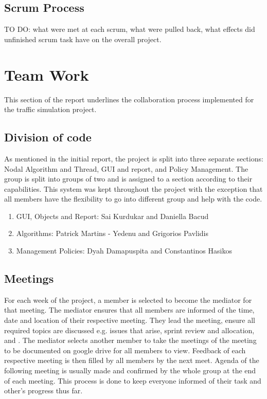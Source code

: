 \documentclass{article}
\begin{document}
		\subsection{Scrum Process}
			TO DO: what were met at each scrum, what were pulled back, what effects did unfinished scrum task have on the overall project.
	\section{Team Work}
		This section of the report underlines the collaboration process implemented for the traffic simulation project.
		\subsection{Division of code}
			As mentioned in the initial report, the project is split into three separate sections: Nodal Algorithm and Thread, GUI and report, and Policy Management.  The group is split into groups of two and is assigned to a section according to their capabilities.  This system was kept throughout the project with the exception that all members have the flexibility to go into different group and help with the code.  
			
			\begin{enumerate}[noitemsep]
                \item GUI, Objects and Report: Sai Kurdukar and Daniella Bacud
                \item Algorithms: Patrick Martins - Yedenu and Grigorios Pavlidis
                \item Management Policies: Dyah Damapuspita and Constantinos Hasikos
            \end{enumerate}
			
		\subsection{Meetings}
			For each week of the project, a member is selected to become the mediator for that meeting.  The mediator ensures that all members are informed of the time, date and location of their respective meeting.  They lead the meeting, ensure all required topics are discussed e.g. issues that arise, sprint review and allocation, and .  The mediator selects another member to take the meetings of the meeting to be documented on google drive for all members to view.  Feedback of each respective meeting is then filled by all members by the next meet.  Agenda of the following meeting is usually made and confirmed by the whole group at the end of each meeting.  This process is done to keep everyone informed of their task and other's progress thus far.
			
\end{document}

